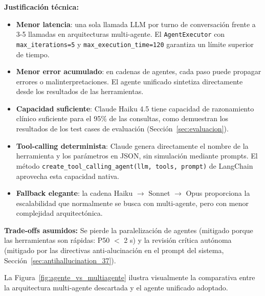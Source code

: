 \begin{tcolorbox}
\textbf{Justificación técnica:}
\begin{itemize}[nosep, leftmargin=*]
  \item \textbf{Menor latencia}: una sola llamada LLM por turno de conversación frente a 3-5 llamadas en arquitecturas multi-agente. El \texttt{AgentExecutor} con \texttt{max\_iterations=5} y \texttt{max\_execution\_time=120} garantiza un límite superior de tiempo.
  \item \textbf{Menor error acumulado}: en cadenas de agentes, cada paso puede propagar errores o malinterpretaciones. El agente unificado sintetiza directamente desde los resultados de las herramientas.
  \item \textbf{Capacidad suficiente}: Claude Haiku 4.5 tiene capacidad de razonamiento clínico suficiente para el 95\% de las consultas, como demuestran los resultados de los test cases de evaluación (Sección~\ref{sec:evaluacion}).
  \item \textbf{Tool-calling determinista}: Claude genera directamente el nombre de la herramienta y los parámetros en JSON, sin simulación mediante prompts. El método \texttt{create\_tool\_calling\_agent(llm, tools, prompt)} de LangChain aprovecha esta capacidad nativa.
  \item \textbf{Fallback elegante}: la cadena Haiku $\rightarrow$ Sonnet $\rightarrow$ Opus proporciona la escalabilidad que normalmente se busca con multi-agente, pero con menor complejidad arquitectónica.
\end{itemize}

\textbf{Trade-offs asumidos:} Se pierde la paralelización de agentes (mitigado porque las herramientas son rápidas: P50 $<$ 2 s) y la revisión crítica autónoma (mitigado por las directivas anti-alucinación en el prompt del sistema, Sección~\ref{sec:antihallucination_37}).
\end{tcolorbox}

La Figura~\ref{fig:agente_vs_multiagente} ilustra visualmente la comparativa entre la arquitectura multi-agente descartada y el agente unificado adoptado.

